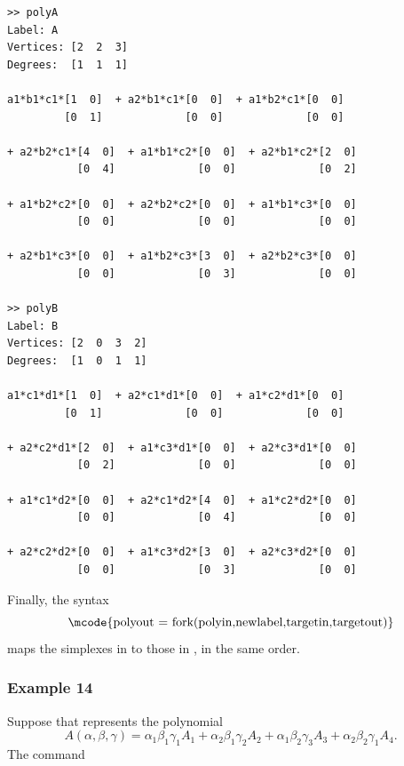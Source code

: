 \documentclass[english,11pt]{article}
\theoremstyle{break} \theorembodyfont{\small\rm}
\begin{document}
\begin{minipage}{15.5cm}
\begin{lstlisting}[rulecolor=\color{red}]
>> polyA
Label: A
Vertices: [2  2  3]
Degrees:  [1  1  1]

a1*b1*c1*[1  0]  + a2*b1*c1*[0  0]  + a1*b2*c1*[0  0]
         [0  1]             [0  0]             [0  0]

+ a2*b2*c1*[4  0]  + a1*b1*c2*[0  0]  + a2*b1*c2*[2  0]
           [0  4]             [0  0]             [0  2]

+ a1*b2*c2*[0  0]  + a2*b2*c2*[0  0]  + a1*b1*c3*[0  0]
           [0  0]             [0  0]             [0  0]

+ a2*b1*c3*[0  0]  + a1*b2*c3*[3  0]  + a2*b2*c3*[0  0]
           [0  0]             [0  3]             [0  0]

>> polyB
Label: B
Vertices: [2  0  3  2]
Degrees:  [1  0  1  1]

a1*c1*d1*[1  0]  + a2*c1*d1*[0  0]  + a1*c2*d1*[0  0]
         [0  1]             [0  0]             [0  0]

+ a2*c2*d1*[2  0]  + a1*c3*d1*[0  0]  + a2*c3*d1*[0  0]
           [0  2]             [0  0]             [0  0]

+ a1*c1*d2*[0  0]  + a2*c1*d2*[4  0]  + a1*c2*d2*[0  0]
           [0  0]             [0  4]             [0  0]

+ a2*c2*d2*[0  0]  + a1*c3*d2*[3  0]  + a2*c3*d2*[0  0]
           [0  0]             [0  3]             [0  0]
\end{lstlisting}
\end{minipage}
\vspace{0.2cm}


Finally, the syntax
\[
\mbox{\mcode{polyout = fork(polyin,newlabel,targetin,targetout)}}
\]
maps the simplexes in  to those in , in the same order.

\subsubsection*{Example 14}
Suppose that  represents the polynomial
\[
 A(\alpha,\beta,\gamma) = \alpha_1 \beta_1 \gamma_1 A_1 + \alpha_2 \beta_1 \gamma_2 A_2  + \alpha_1 \beta_2 \gamma_3 A_3 + \alpha_2 \beta_2 \gamma_1 A_4.
\]
The command

\vspace{0.5cm}%
\noindent\begin{minipage}{\linewidth}
\end{minipage}
\vspace{0.2cm}
\end{document}
